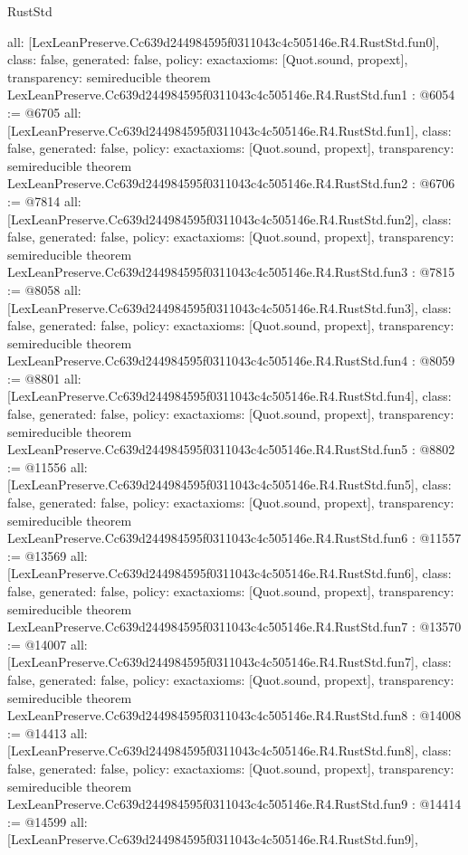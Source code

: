 \begin{lexlean}{RustStd}
\begin{coremodule}
{  all: [LexLeanPreserve.Cc639d244984595f0311043c4c505146e.R4.RustStd.fun0],
  class: false,
  generated: false,
  policy: exact{axioms: [Quot.sound, propext]},
  transparency: semireducible
}
theorem LexLeanPreserve.Cc639d244984595f0311043c4c505146e.R4.RustStd.fun1 : @6054 := @6705 {
  all: [LexLeanPreserve.Cc639d244984595f0311043c4c505146e.R4.RustStd.fun1],
  class: false,
  generated: false,
  policy: exact{axioms: [Quot.sound, propext]},
  transparency: semireducible
}
theorem LexLeanPreserve.Cc639d244984595f0311043c4c505146e.R4.RustStd.fun2 : @6706 := @7814 {
  all: [LexLeanPreserve.Cc639d244984595f0311043c4c505146e.R4.RustStd.fun2],
  class: false,
  generated: false,
  policy: exact{axioms: [Quot.sound, propext]},
  transparency: semireducible
}
theorem LexLeanPreserve.Cc639d244984595f0311043c4c505146e.R4.RustStd.fun3 : @7815 := @8058 {
  all: [LexLeanPreserve.Cc639d244984595f0311043c4c505146e.R4.RustStd.fun3],
  class: false,
  generated: false,
  policy: exact{axioms: [Quot.sound, propext]},
  transparency: semireducible
}
theorem LexLeanPreserve.Cc639d244984595f0311043c4c505146e.R4.RustStd.fun4 : @8059 := @8801 {
  all: [LexLeanPreserve.Cc639d244984595f0311043c4c505146e.R4.RustStd.fun4],
  class: false,
  generated: false,
  policy: exact{axioms: [Quot.sound, propext]},
  transparency: semireducible
}
theorem LexLeanPreserve.Cc639d244984595f0311043c4c505146e.R4.RustStd.fun5 : @8802 := @11556 {
  all: [LexLeanPreserve.Cc639d244984595f0311043c4c505146e.R4.RustStd.fun5],
  class: false,
  generated: false,
  policy: exact{axioms: [Quot.sound, propext]},
  transparency: semireducible
}
theorem LexLeanPreserve.Cc639d244984595f0311043c4c505146e.R4.RustStd.fun6 : @11557 := @13569 {
  all: [LexLeanPreserve.Cc639d244984595f0311043c4c505146e.R4.RustStd.fun6],
  class: false,
  generated: false,
  policy: exact{axioms: [Quot.sound, propext]},
  transparency: semireducible
}
theorem LexLeanPreserve.Cc639d244984595f0311043c4c505146e.R4.RustStd.fun7 : @13570 := @14007 {
  all: [LexLeanPreserve.Cc639d244984595f0311043c4c505146e.R4.RustStd.fun7],
  class: false,
  generated: false,
  policy: exact{axioms: [Quot.sound, propext]},
  transparency: semireducible
}
theorem LexLeanPreserve.Cc639d244984595f0311043c4c505146e.R4.RustStd.fun8 : @14008 := @14413 {
  all: [LexLeanPreserve.Cc639d244984595f0311043c4c505146e.R4.RustStd.fun8],
  class: false,
  generated: false,
  policy: exact{axioms: [Quot.sound, propext]},
  transparency: semireducible
}
theorem LexLeanPreserve.Cc639d244984595f0311043c4c505146e.R4.RustStd.fun9 : @14414 := @14599 {
  all: [LexLeanPreserve.Cc639d244984595f0311043c4c505146e.R4.RustStd.fun9],
}
\end{coremodule}
\end{lexlean}
